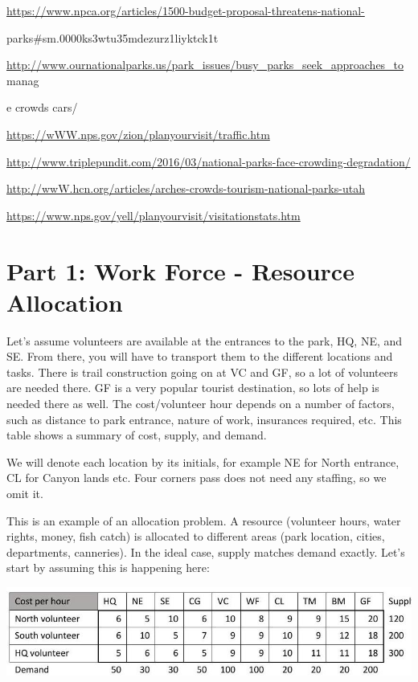 \documentclass[10pt]{article}
\begin{document}
\href{https://www.npca.org/articles/1500-budget-proposal-threatens-national-}{https://www.npca.org/articles/1500-budget-proposal-threatens-national-}

parks\#sm.0000ks3wtu35mdezurz1liyktck1t

\href{http://www.ournationalparks.us/park_issues/busy_parks_seek_approaches_to}{http://www.ournationalparks.us/park\_issues/busy\_parks\_seek\_approaches\_to} manag

e crowds cars/

\href{https://wWW.nps.gov/zion/planyourvisit/traffic.htm}{https://wWW.nps.gov/zion/planyourvisit/traffic.htm}

\href{http://www.triplepundit.com/2016/03/national-parks-face-crowding-degradation/}{http://www.triplepundit.com/2016/03/national-parks-face-crowding-degradation/}

\href{http://wwW.hcn.org/articles/arches-crowds-tourism-national-parks-utah}{http://wwW.hcn.org/articles/arches-crowds-tourism-national-parks-utah}

\href{https://www.nps.gov/yell/planyourvisit/visitationstats.htm}{https://www.nps.gov/yell/planyourvisit/visitationstats.htm}

\section{Part 1: Work Force - Resource Allocation}
Let's assume volunteers are available at the entrances to the park, HQ, NE, and SE. From there, you will have to transport them to the different locations and tasks. There is trail construction going on at VC and GF, so a lot of volunteers are needed there. GF is a very popular tourist destination, so lots of help is needed there as well. The cost/volunteer hour depends on a number of factors, such as distance to park entrance, nature of work, insurances required, etc. This table shows a summary of cost, supply, and demand.

We will denote each location by its initials, for example NE for North entrance, CL for Canyon lands etc. Four corners pass does not need any staffing, so we omit it.

This is an example of an allocation problem. A resource (volunteer hours, water rights, money, fish catch) is allocated to different areas (park location, cities, departments, canneries). In the ideal case, supply matches demand exactly. Let's start by assuming this is happening here:

\includegraphics[max width=\textwidth]{2022_07_05_5945264bba2a5f6ba667g-42}
\end{document}
